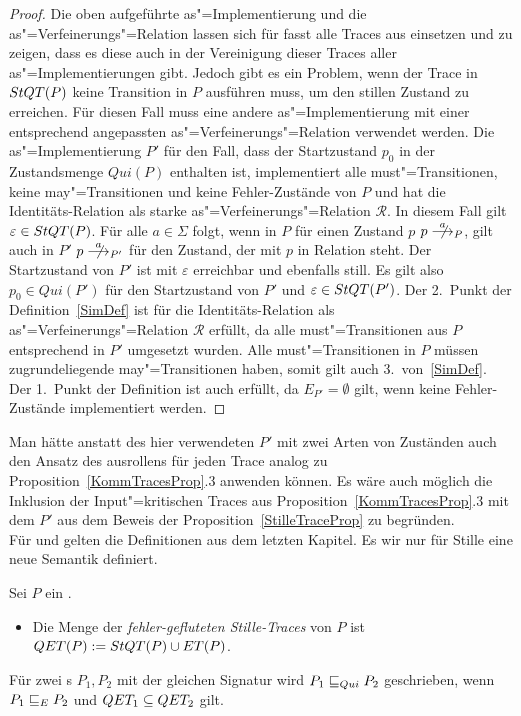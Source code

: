 \begin{proof}
  Die oben aufgeführte as"=Implementierung und die as"=Verfeinerungs"=Relation
  lassen sich für fasst alle Traces aus \StQT{} einsetzen und zu zeigen, dass
  es diese auch in der Vereinigung dieser Traces aller as"=Implementierungen
  gibt. Jedoch gibt es ein Problem, wenn der Trace in $StQT (P)$ keine
  Transition in $P$ ausführen muss, um den stillen Zustand zu erreichen. Für
  diesen Fall muss eine andere as"=Implementierung mit einer entsprechend
  angepassten as"=Verfeinerungs"=Relation verwendet werden. Die
  as"=Implementierung $P'$ für den Fall, dass der Startzustand $p_0$ in der
  Zustandsmenge $Qui (P)$ enthalten ist, implementiert alle must"=Transitionen,
  keine may"=Transitionen und keine Fehler-Zustände von $P$ und hat die
  Identitäts-Relation als starke as"=Verfeinerungs"=Relation $\mathcal{R}$. In
  diesem Fall gilt $\varepsilon\in StQT (P)$. Für alle $a\in\Sigma$ folgt, wenn
  in $P$ für einen Zustand $p$ $p\nmust[a]_P$, gilt auch in $P'$ $p
  \nmust[a]_{P'}$ für den Zustand, der mit $p$ in Relation steht. Der
  Startzustand von $P'$ ist mit $\varepsilon$ erreichbar und ebenfalls still.
  Es gilt also $p_0\in Qui (P')$ für den Startzustand von $P'$ und
  $\varepsilon\in StQT (P')$. Der 2.\ Punkt der Definition~\ref{SimDef} ist für
  die Identitäts-Relation als as"=Verfeinerungs"=Relation $\mathcal{R}$
  erfüllt, da alle must"=Transitionen aus $P$ entsprechend in $P'$ umgesetzt
  wurden. Alle must"=Transitionen in $P$ müssen zugrundeliegende
  may"=Transitionen haben, somit gilt auch 3.\ von~\ref{SimDef}. Der 1.\ Punkt
  der Definition ist auch erfüllt, da $E_{P'}=\emptyset$ gilt, wenn keine
  Fehler-Zustände implementiert werden.
\end{proof}

Man hätte anstatt des hier verwendeten $P'$ mit zwei Arten von Zuständen auch
den Ansatz des ausrollens für jeden Trace analog zu
Proposition~\ref{KommTracesProp}.3 anwenden können. Es wäre auch möglich die
Inklusion der Input"=kritischen Traces aus Proposition~\ref{KommTracesProp}.3
mit dem $P'$ aus dem Beweis der Proposition~\ref{StilleTraceProp} zu
begründen.\\
Für \ET{} und \EL{} gelten die Definitionen aus dem letzten Kapitel. Es wir nur
für Stille eine neue Semantik definiert.

\begin{Def}
  \label{StilleSemDef}
  Sei $P$ ein \MEIO{}.
  \begin{itemize}
    \item Die Menge der \emph{fehler-gefluteten Stille-Traces} von $P$ ist $QET
      (P):= StQT (P)\cup ET (P)$.
  \end{itemize}
  Für zwei \MEIO{}s $P_1,P_2$ mit der gleichen Signatur wird $P_1 \sqsubseteq  _{Qui}{} P_2$
  geschrieben, wenn $P_1 \sqsubseteq  _E{} P_2$ und $QET _1\subseteq QET _2$ gilt.
\end{Def}

